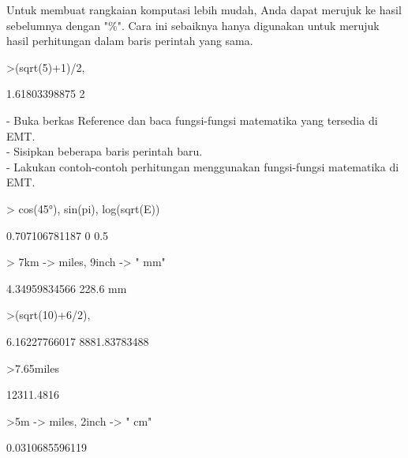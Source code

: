 \documentclass{article}
\begin{document}
\begin{eulernotebook}
\begin{eulercomment}
\begin{eulercomment}
\begin{eulercomment}
Untuk membuat rangkaian komputasi lebih mudah, Anda dapat merujuk ke hasil
sebelumnya dengan "\%". Cara ini sebaiknya hanya digunakan untuk merujuk hasil
perhitungan dalam baris perintah yang sama.
\end{eulercomment}
\begin{eulerprompt}
>(sqrt(5)+1)/2, %
\end{eulerprompt}
\begin{euleroutput}
  1.61803398875
  2
\end{euleroutput}
\begin{eulercomment}
- Buka berkas Reference dan baca fungsi-fungsi matematika yang
tersedia di EMT.\\
- Sisipkan beberapa baris perintah baru.\\
- Lakukan contoh-contoh perhitungan menggunakan fungsi-fungsi
matematika di EMT.\\
\end{eulercomment}
\eulersubheading{}
\begin{eulercomment}
\end{eulercomment}
\begin{eulerprompt}
> cos(45°), sin(pi), log(sqrt(E))
\end{eulerprompt}
\begin{euleroutput}
  0.707106781187
  0
  0.5
\end{euleroutput}
\begin{eulerprompt}
> 7km -> miles, 9inch -> " mm"
\end{eulerprompt}
\begin{euleroutput}
  4.34959834566
  228.6 mm
\end{euleroutput}
\begin{eulerprompt}
>(sqrt(10)+6/2), %
\end{eulerprompt}
\begin{euleroutput}
  6.16227766017
  8881.83783488
\end{euleroutput}
\begin{eulerprompt}
>7.65miles
\end{eulerprompt}
\begin{euleroutput}
  12311.4816
\end{euleroutput}
\begin{eulerprompt}
>5m -> miles, 2inch -> " cm"
\end{eulerprompt}
\begin{euleroutput}
  0.0310685596119

\end{euleroutput}
\end{eulercomment}
\end{eulercomment}
\end{eulernotebook}
\end{document}

